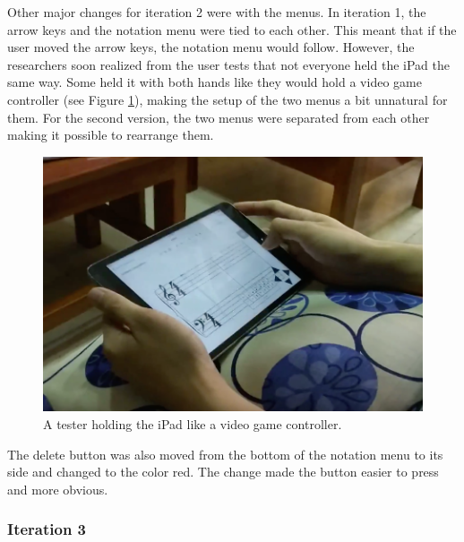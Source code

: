 				Other major changes for iteration 2 were with the menus. In iteration 1, the arrow keys and the notation menu were tied to each other. This meant that if the user moved the arrow keys, the notation menu would follow. However, the researchers soon realized from the user tests that not everyone held the iPad the same way. Some held it with both hands like they would hold a video game controller (see Figure \ref{fig:handheld_ipad}), making the setup of the two menus a bit unnatural for them. For the second version, the two menus were separated from each other making it possible to rearrange them. 


				\begin{figure}[h]
					\centering
					\includegraphics[scale=0.3]{figures/anthony-handheld-ipad.png}
				    \caption{A tester holding the iPad like a video game controller.}
				    \label{fig:handheld_ipad}
				\end{figure}

				The delete button was also moved from the bottom of the notation menu to its side and changed to the color red. The change made the button easier to press and more obvious. 

			\subsubsection{Iteration 3}

